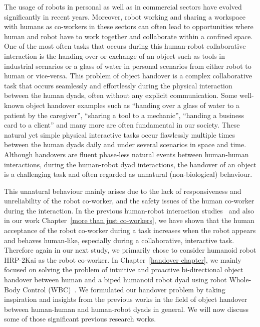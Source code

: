 The usage of robots in personal as well as in commercial sectors have evolved significantly in recent years. Moreover, robot working and sharing a workspace with humans as co-workers in these sectors can often lead to opportunities where human and robot have to work together and collaborate within a confined space. One of the most often tasks that occurs during this human-robot collaborative interaction is the handing-over or exchange of an object such as tools in industrial scenarios or a glass of water in personal scenarios from either robot to human or vice-versa. This problem of object handover is a complex collaborative task that occurs seamlessly and effortlessly during the physical interaction between the human dyads, often without any explicit communication. Some well-known object handover examples such as ``handing over a glass of water to a patient by the caregiver'', ``sharing a tool to a mechanic'', ``handing a business card to a client'' and many more are often fundamental in our society. These natural yet simple physical interactive tasks occur flawlessly multiple times between the human dyads daily and under several scenarios in space and time. Although handovers are fluent phase-less natural events between human-human interactions, during the human-robot dyad interactions, the handover of an object is a challenging task and often regarded as unnatural (non-biological) behaviour. 

This unnatural behaviour mainly arises due to the lack of responsiveness and unreliability of the robot co-worker, and the safety issues of the human co-worker during the interaction. In the previous human-robot interaction studies~\cite{huber2008human, strabala2013toward, shibata1995experimental} and also in our work Chapter~\ref{more than just co-workers}, we have shown that the human acceptance of the robot co-worker during a task increases when the robot appears and behaves human-like, especially during a collaborative, interactive task. Therefore again in our next study, we primarily chose to consider humanoid robot HRP-2Kai as the robot co-worker. In Chapter~\ref{handover chapter}, we mainly focused on solving the problem of intuitive and proactive bi-directional object handover between human and a biped humanoid robot dyad using robot Whole-Body Control (WBC)~\cite{bouyarmane2018quadratic, ladder-HRP-2Kai, bouyarmane2011using, sentis2006whole}. We formulated our handover problem by taking inspiration and insights from the previous works in the field of object handover between human-human and human-robot dyads in general. We will now discuss some of those significant previous research works.

